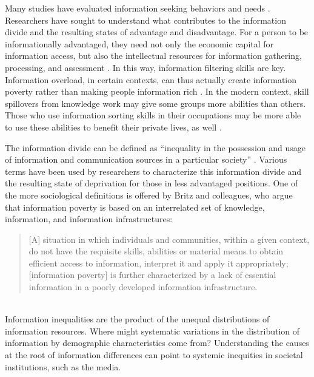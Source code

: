 \documentclass[11pt]{article}
\begin{document}
Many studies have evaluated information seeking behaviors and needs
\citep{Case2016}. Researchers have sought to understand what contributes to the information divide
and the resulting states of advantage and disadvantage. For a person to be
informationally advantaged, they need not only the economic capital for
information access, but also the intellectual resources for information
gathering, processing, and assessment \citep{Sweetland1993}. In this way,
information filtering skills are key. Information overload, in certain contexts,
can thus actually create information poverty rather than making people
information rich \citep{Yu2006}. In the modern context, skill spillovers from
knowledge work may give some groups more abilities than others. Those who use
information sorting skills in their occupations may be more able to use these
abilities to benefit their private lives, as well \citep{Xanthopoulou2012}.

The information divide can be defined as ``inequality in the possession and usage of
information and communication sources in a particular society''
\citep{VanDijk1997,VanDijk2000}. Various terms have been used by researchers to characterize this information
divide and the resulting state of deprivation for those in less advantaged
positions. One of the more sociological definitions is offered by Britz and
colleagues, who argue that information poverty is based on an interrelated
set of knowledge, information, and information infrastructures:

\noindent\begin{minipage}{\linewidth}
\begin{quote}
  [A] situation in which individuals and communities, within a given context, do
  not have the requisite skills, abilities or material means to obtain efficient
  access to information, interpret it and apply it appropriately; [information poverty] is
  further characterized by a lack of essential information in a poorly developed
  information infrastructure. \citep[194]{Britz2004}
\end{quote}
\end{minipage} \\

Information inequalities are the product of the unequal distributions of information resources.
Where might systematic variations in the distribution of
information by demographic characteristics come from? Understanding the causes
at the root of information differences can point to systemic inequities in societal institutions, such as the media.
\end{document}
